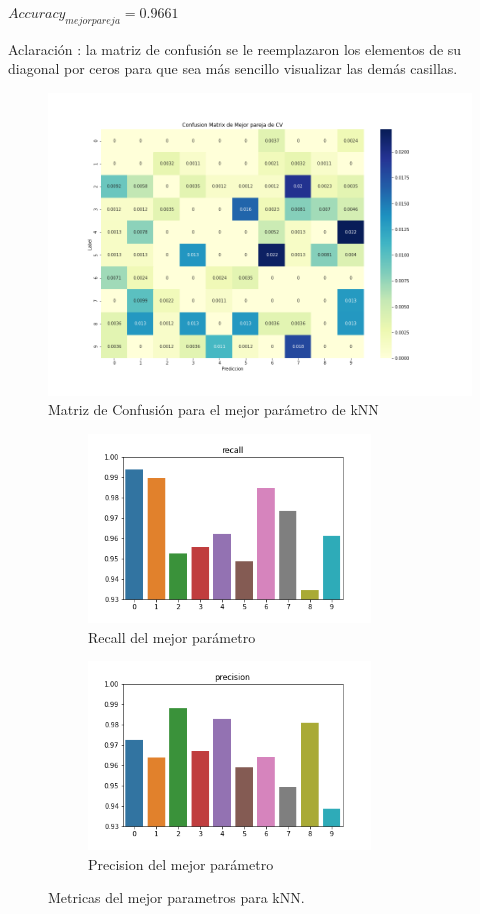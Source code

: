 $Accuracy_{mejor pareja} = 0.9661 $
\par
\vspace{0.5cm}
Aclaración : la matriz de confusión se le reemplazaron los elementos de su diagonal por ceros para que sea más sencillo visualizar las demás casillas.
\begin{figure}[H]
    \centering
    \includegraphics[width=14cm]{images/ConfMatrix_knn.png}%
    \qquad
    \caption{Matriz de Confusión para el mejor parámetro de kNN }
    \label{knn_MatrizConf}%
\end{figure}



\begin{figure}[H]
\begin{subfigure}{0.5\textwidth}
\includegraphics[width=0.9\linewidth, height=5cm]{images/recall_knn.png} 
\caption{Recall del mejor parámetro}
\end{subfigure}
\begin{subfigure}{0.5\textwidth}
\includegraphics[width=0.9\linewidth, height=5cm]{images/precision_knn.png} 
\caption{Precision del mejor parámetro}
\end{subfigure}
\caption{Metricas del mejor parametros para kNN.}
\label{knn_metricas}%
\end{figure}





